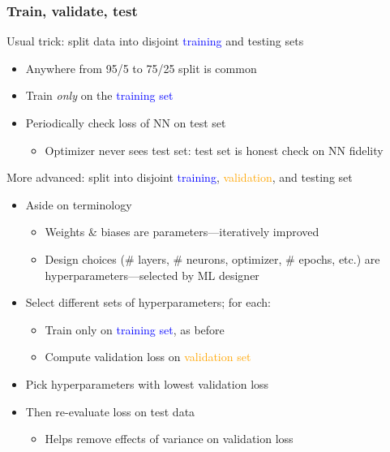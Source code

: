 \begin{frame}
    \frametitle{Train, validate, test}

    Usual trick: split data into disjoint \textcolor{blue}{training} and \textcolor{Green4}{testing} sets
    \begin{itemize}
        \item Anywhere from 95/5 to 75/25 split is common
        \item Train \emph{only} on the \textcolor{blue}{training set}
        \item Periodically check loss of NN on \textcolor{Green4}{test set}
        \begin{itemize}
            \item Optimizer never sees test set: test set is honest check on NN fidelity
        \end{itemize}
    \end{itemize}
    \pause

    More advanced: split into disjoint \textcolor{blue}{training}, \textcolor{orange}{validation}, and \textcolor{Green4}{testing} set
    \begin{itemize}
        \item Aside on terminology
        \begin{itemize}
            \item Weights \& biases are \alert{parameters}---iteratively improved
            \item Design choices (\# layers, \# neurons, optimizer, \# epochs, etc.) are \alert{hyperparameters}---selected by ML designer
        \end{itemize}
        \pause
        \item Select different sets of hyperparameters; for each:
        \begin{itemize}
            \item Train only on \textcolor{blue}{training set}, as before
            \item Compute validation loss on \textcolor{orange}{validation set}
        \end{itemize}
        \pause
        \item Pick hyperparameters with lowest validation loss
        \item Then re-evaluate loss on \textcolor{Green4}{test data}
        \begin{itemize}
            \item Helps remove effects of variance on validation loss
        \end{itemize}
    \end{itemize}
\end{frame}

